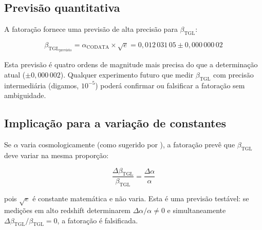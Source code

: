 \documentclass[12pt,a4paper,twoside]{article}
\newcommand{\betatgl}{\beta_{\!\scriptscriptstyle\mathrm{TGL}}}
\begin{document}
\subsection{Previsão quantitativa}

A fatoração fornece uma previsão de alta precisão para $\betatgl$:

\begin{equation}
\betatgl_{\text{previsto}} = \alpha_{\text{CODATA}} \times \sqrt{e} = 0{,}012\,031\,05 \pm 0{,}000\,000\,02
\end{equation}

Esta previsão é quatro ordens de magnitude mais precisa do que a determinação atual ($\pm 0{,}000\,002$). Qualquer experimento futuro que medir $\betatgl$ com precisão intermediária (digamos, $10^{-5}$) poderá confirmar ou falsificar a fatoração sem ambiguidade.

\subsection{Implicação para a variação de constantes}

Se $\alpha$ varia cosmologicamente (como sugerido por \cite{Webb2001}), a fatoração prevê que $\betatgl$ deve variar na mesma proporção:

\begin{equation}
\frac{\Delta\betatgl}{\betatgl} = \frac{\Delta\alpha}{\alpha}
\label{eq:variacao}
\end{equation}

\noindent pois $\sqrt{e}$ é constante matemática e não varia. Esta é uma previsão testável: se medições em alto redshift determinarem $\Delta\alpha/\alpha \neq 0$ e simultaneamente $\Delta\betatgl/\betatgl = 0$, a fatoração é falsificada.

%
%
%
%
%
%
%
\end{document}
